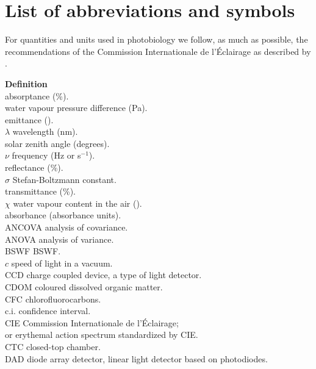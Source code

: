 
\chapter{List of abbreviations and symbols}\label{chap:abbrev}

For quantities and units used in photobiology we follow, as much as possible, the recommendations of the Commission Internationale de l'Éclairage as described by \autocite{Sliney2007}.
\begin{tabbing}
 \= \textbf{Definition} \\[1ex]
\abst  \> \gls{absorptance} (\%).\\
\deltae \> water vapour pressure difference (Pa).\\
\emitt \> emittance (\watt).\\
$\lambda$ \>  wavelength (nm).\\
\SZA   \> solar zenith angle (degrees).\\
$\nu$ \> frequency (Hz or s$^{-1}$).\\
  \> \gls{reflectance} (\%).\\
$\sigma$ \> Stefan-Boltzmann constant.\\
\trans \> \gls{transmittance} (\%).\\
$\chi$ \> water vapour content in the air (\gmcubic).\\
\absb  \> \gls{absorbance} (absorbance units).\\
ANCOVA \> analysis of covariance.\\
ANOVA \> analysis of variance.\\
BSWF \> \gls{BSWF}.\\
$c$ \> speed of light in a vacuum.\\
CCD \> charge coupled device, a type of light detector.\\
CDOM \> coloured dissolved organic matter.\\
CFC \> chlorofluorocarbons.\\
c.i.\> confidence interval.\\
CIE \>  Commission Internationale de l'Éclairage;\\%
    \>  or erythemal action spectrum standardized by CIE.\\
CTC \> closed-top chamber.\\
DAD \> diode array detector, linear light detector based on photodiodes.\\

\end{tabbing}
